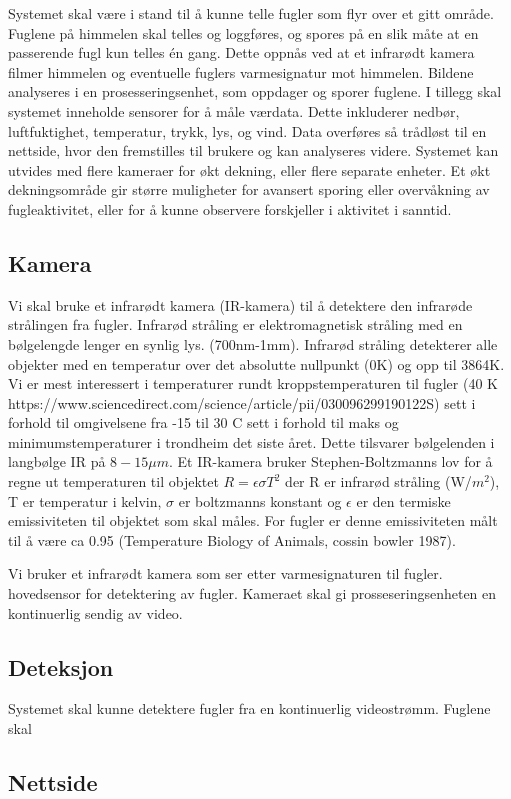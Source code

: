 Systemet skal være i stand til å kunne telle fugler som flyr over et gitt område. Fuglene på himmelen skal telles og loggføres, og spores på en slik måte at en passerende fugl kun telles én gang. Dette oppnås ved at et infrarødt kamera filmer himmelen og eventuelle fuglers varmesignatur mot himmelen. Bildene analyseres i en prosesseringsenhet, som oppdager og sporer fuglene. I tillegg skal systemet inneholde sensorer for å måle værdata. Dette inkluderer nedbør, luftfuktighet, temperatur, trykk, lys, og vind. Data overføres så trådløst til en nettside, hvor den fremstilles til brukere og kan analyseres videre. Systemet kan utvides med flere kameraer for økt dekning, eller flere separate enheter. Et økt dekningsområde gir større muligheter for avansert sporing eller overvåkning av fugleaktivitet, eller for å kunne observere forskjeller i aktivitet i sanntid.




\subsection{Kamera}

Vi skal bruke et infrarødt kamera (IR-kamera) til å detektere den infrarøde strålingen fra fugler. Infrarød stråling er elektromagnetisk stråling med en bølgelengde lenger en synlig lys. (700nm-1mm). Infrarød stråling detekterer alle objekter med en temperatur over det absolutte nullpunkt (0K) og opp til 3864K. Vi er mest interessert i temperaturer rundt kroppstemperaturen til fugler (40 K https://www.sciencedirect.com/science/article/pii/030096299190122S) sett i forhold til omgivelsene fra -15 til 30 C sett i forhold til maks og minimumstemperaturer i trondheim det siste året. Dette tilsvarer bølgelenden i langbølge IR på $8-15\mu m$. Et IR-kamera bruker Stephen-Boltzmanns lov for å regne ut temperaturen til objektet $R=\epsilon \sigma T^2$ der R er infrarød stråling (W/$m^2$), T er temperatur i kelvin, $\sigma$ er boltzmanns konstant og $\epsilon$ er den termiske emissiviteten til objektet som skal måles. For fugler er denne emissiviteten målt til å være ca 0.95 (Temperature Biology
of Animals, cossin bowler 1987). 


Vi bruker et infrarødt kamera som ser etter varmesignaturen til fugler. hovedsensor for detektering av fugler. Kameraet skal gi prosseseringsenheten en kontinuerlig sendig av video.


\subsection{Deteksjon}
Systemet skal kunne detektere fugler fra en kontinuerlig videostrømm. Fuglene skal 



\subsection{Nettside}


